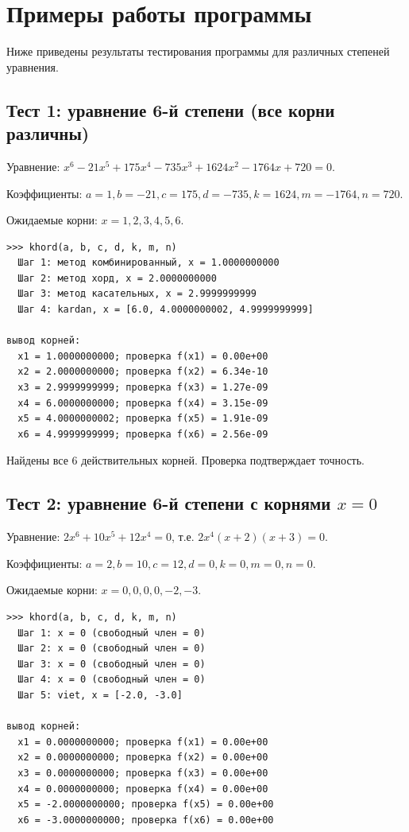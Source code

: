 \documentclass[a4paper,14pt]{extarticle}
\begin{document}
\newpage
\section*{Примеры работы программы}
\label{sec:tests}

Ниже приведены результаты тестирования программы для различных степеней уравнения.

\subsection*{Тест 1: уравнение 6-й степени (все корни различны)}

Уравнение: $x^6 - 21x^5 + 175x^4 - 735x^3 + 1624x^2 - 1764x + 720 = 0$.

Коэффициенты: $a=1, b=-21, c=175, d=-735, k=1624, m=-1764, n=720$.

Ожидаемые корни: $x = 1, 2, 3, 4, 5, 6$.

\begin{Verbatim}[frame=single,fontsize=\footnotesize]
>>> khord(a, b, c, d, k, m, n)
  Шаг 1: метод комбинированный, x = 1.0000000000
  Шаг 2: метод хорд, x = 2.0000000000
  Шаг 3: метод касательных, x = 2.9999999999
  Шаг 4: kardan, x = [6.0, 4.0000000002, 4.9999999999]

вывод корней:
  x1 = 1.0000000000; проверка f(x1) = 0.00e+00
  x2 = 2.0000000000; проверка f(x2) = 6.34e-10
  x3 = 2.9999999999; проверка f(x3) = 1.27e-09
  x4 = 6.0000000000; проверка f(x4) = 3.15e-09
  x5 = 4.0000000002; проверка f(x5) = 1.91e-09
  x6 = 4.9999999999; проверка f(x6) = 2.56e-09
\end{Verbatim}

Найдены все 6 действительных корней. Проверка подтверждает точность.

\subsection*{Тест 2: уравнение 6-й степени с корнями $x=0$}

Уравнение: $2x^6 + 10x^5 + 12x^4 = 0$, т.е. $2x^4(x+2)(x+3) = 0$.

Коэффициенты: $a=2, b=10, c=12, d=0, k=0, m=0, n=0$.

Ожидаемые корни: $x = 0, 0, 0, 0, -2, -3$.

\begin{Verbatim}[frame=single,fontsize=\footnotesize]
>>> khord(a, b, c, d, k, m, n)
  Шаг 1: x = 0 (свободный член = 0)
  Шаг 2: x = 0 (свободный член = 0)
  Шаг 3: x = 0 (свободный член = 0)
  Шаг 4: x = 0 (свободный член = 0)
  Шаг 5: viet, x = [-2.0, -3.0]

вывод корней:
  x1 = 0.0000000000; проверка f(x1) = 0.00e+00
  x2 = 0.0000000000; проверка f(x2) = 0.00e+00
  x3 = 0.0000000000; проверка f(x3) = 0.00e+00
  x4 = 0.0000000000; проверка f(x4) = 0.00e+00
  x5 = -2.0000000000; проверка f(x5) = 0.00e+00
  x6 = -3.0000000000; проверка f(x6) = 0.00e+00
\end{Verbatim}
\end{document}
